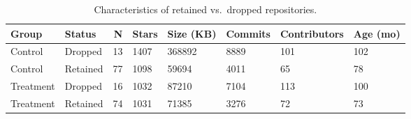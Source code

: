 \begin{table}[!h]

\caption{\label{tab:attrition}Characteristics of retained vs.\ dropped repositories.}
\centering
\begin{tabular}[t]{llrlllll}
\toprule
Group & Status & N & Stars & Size (KB) & Commits & Contributors & Age (mo)\\
\midrule
Control & Dropped & 13 & 1407 & 368892 & 8889 & 101 & 102\\
Control & Retained & 77 & 1098 & 59694 & 4011 & 65 & 78\\
Treatment & Dropped & 16 & 1032 & 87210 & 7104 & 113 & 100\\
Treatment & Retained & 74 & 1031 & 71385 & 3276 & 72 & 73\\
\bottomrule
\end{tabular}
\end{table}
